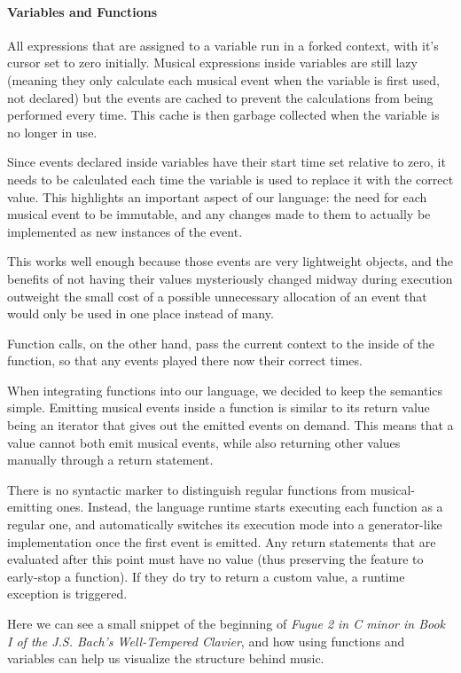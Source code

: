 \documentclass[a4paper,UKenglish,cleveref, autoref]{oasics-v2019}
\begin{document}
\paragraph*{Variables and Functions}
All expressions that are assigned to a variable run in a forked context, with it's cursor set to zero initially. Musical expressions inside variables are still lazy (meaning they only calculate each musical event when the variable is first used, not declared) but the events are cached to prevent the calculations from being performed every time. This cache is then garbage collected when the variable is no longer in use.

Since events declared inside variables have their start time set relative to zero, it needs to be calculated each time the variable is used to replace it with the correct value. This highlights an important aspect of our language: the need for each musical event to be immutable, and any changes made to them to actually be implemented as new instances of the event.

This works well enough because those events are very lightweight objects, and the benefits of not having their values mysteriously changed midway during execution outweight the small cost of a possible unnecessary allocation of an event that would only be used in one place instead of many.

Function calls, on the other hand, pass the current context to the inside of the function, so  that any events played there now their correct times.

When integrating functions into our language, we decided to keep the semantics simple. Emitting musical events inside a function is similar to its return value being an iterator that gives out the emitted events on demand. This means that a value cannot both emit musical events, while also returning other values manually through a return statement.

There is no syntactic marker to distinguish regular functions from musical-emitting ones. Instead, the language runtime starts executing each function as a regular one, and automatically switches its execution mode into a generator-like implementation once the first event is emitted. Any return statements that are evaluated after this point must have no value (thus preserving the feature to early-stop a function). If they do try to return a custom value, a runtime exception is triggered.

Here we can see a small snippet of the beginning of \textit{Fugue 2 in C minor in Book I of the J.S. Bach’s Well-Tempered Clavier}, and how using functions and variables can help us visualize the structure behind music.
\end{document}
